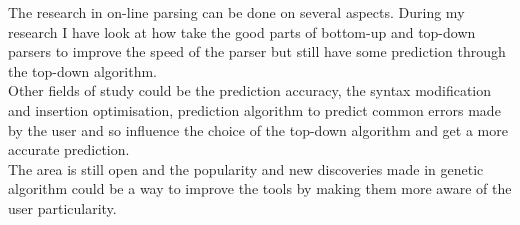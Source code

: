 The research in on-line parsing can be done on several aspects. During my research I have look at how take the good parts of bottom-up and top-down parsers to improve the speed of the parser but still have some prediction through the top-down algorithm.\\
Other fields of study could be the prediction accuracy, the syntax modification and insertion optimisation, prediction algorithm to predict common errors made by the user and so influence the choice of the top-down algorithm and get a more accurate prediction.\\
The area is still open and the popularity and new discoveries made in genetic algorithm could be a way to improve the tools by making them more aware of the user particularity.
